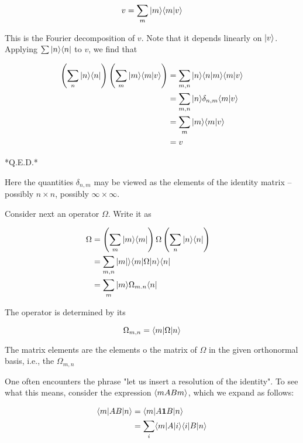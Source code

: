 \begin{equation}
  v = \sum_m | m \rangle\langle m | v \rangle
\end{equation}

This is the Fourier decomposition of $v$.  Note that it depends linearly on $| v \rangle$. Applying $\sum | n \rangle\langle n|$ to $v$, we find that

\begin{align}
\left(\sum_n  | n\rangle \langle n |\right) \left(\sum_m | m \rangle\langle m | v \rangle \right) &=
\sum_{m,n}  | n \rangle \langle n |m \rangle\langle m | v \rangle  \\
&= \sum_{m,n}  | n \rangle \delta_{n,m}\langle m | v \rangle \\
& = \sum_{m}  | m \rangle \langle m | v \rangle \\
&= v
\end{align}

*Q.E.D.*

Here the quantities $\delta_{n,m}$ may be viewed as the elements of the identity matrix  -- possibly $n\times n$, possibly $\infty\times\infty$.

Consider next an operator $\Omega$.  Write it as

\begin{align}
\Omega &= \left(\sum_m  | m \rangle \langle m |\right) \Omega \left(\sum_n  | n \rangle \langle n | \right) \\
&= \sum_{m,n}  |m | \rangle \langle m |  \Omega | n \rangle \langle n | & \\
& = \sum_m  | m\rangle   \Omega_{m.n} \langle n |
\end{align}

The operator  is determined by its 

\begin{equation}
\Omega_{m,n} = \langle m |  \Omega | n \rangle
\end{equation}

The matrix elements are the elements o the matrix of  $\Omega$ in the given orthonormal basis, i.e.,  the $\Omega_{m,n}$

One often encounters the phrase "let us insert a resolution of the identity".  To see what this means, consider the expression $\langle m AB m \rangle$, which we expand as follows:

\begin{align}
\langle m | AB  | n \rangle  &= \langle m | A {\bf 1}B | n \rangle \\
&= \sum_i \langle m | A | i \rangle \langle i | B | n \rangle
\end{align}

